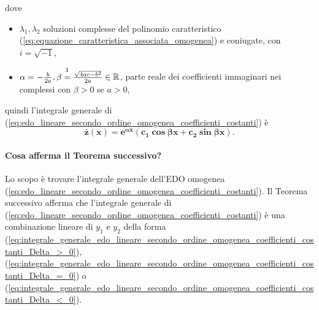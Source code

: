 \begin{enumerate}
	dove
	\begin{itemize}
		\item $\lambda_1,\lambda_2$ soluzioni complesse del polinomio caratteristico (\ref{eq:equazione_caratteristica_associata_omogenea}) e coniugate, con $i=\sqrt{-1}$,
		\item $\alpha = -\frac{b}{2a}, \beta\overset{\footnotemark}{=}\frac{\sqrt{4ac-b^2}}{2a}\in\mathbb{R}$, parte reale dei coefficienti immaginari nei complessi con $\beta>0$ se $a>0$,
	\end{itemize}
	quindi l'integrale generale di (\ref{eq:edo_lineare_secondo_ordine_omogenea_coefficienti_costanti}) è
	\begin{equation}\label{eq:integrale_generale_edo_lineare_secondo_ordine_omogenea_coefficienti_costanti_Delta_<_0}
		\boldsymbol{\bar z(x) = e^{\alpha x}(c_1\cos\beta x + c_2\sin\beta x)}.
	\end{equation}
\end{enumerate}

\paragraph{Cosa afferma il Teorema successivo?} Lo scopo è trovare l'integrale generale dell'EDO omogenea (\ref{eq:edo_lineare_secondo_ordine_omogenea_coefficienti_costanti}). Il Teorema successivo afferma che l'integrale generale di (\ref{eq:edo_lineare_secondo_ordine_omogenea_coefficienti_costanti}) è una combinazione lineare di $y_1$ e $y_2$ della forma (\ref{eq:integrale_generale_edo_lineare_secondo_ordine_omogenea_coefficienti_costanti_Delta_>_0}), (\ref{eq:integrale_generale_edo_lineare_secondo_ordine_omogenea_coefficienti_costanti_Delta_=_0}) o (\ref{eq:integrale_generale_edo_lineare_secondo_ordine_omogenea_coefficienti_costanti_Delta_<_0}). 

